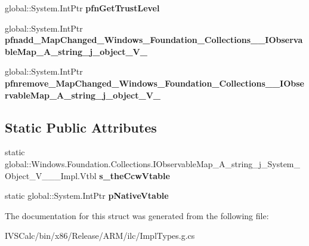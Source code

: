 \begin{DoxyCompactItemize}
global\+::\+System.\+Int\+Ptr {\bfseries pfn\+Get\+Trust\+Level}
\item 
\mbox{\label{struct_windows_1_1_foundation_1_1_collections_1_1_i_observable_map___a__string__j___system___object___v_______impl_1_1_vtbl_acc0abb5a3e0355e29f69ebc4e71413c5}} 
global\+::\+System.\+Int\+Ptr {\bfseries pfnadd\+\_\+\+Map\+Changed\+\_\+\+Windows\+\_\+\+Foundation\+\_\+\+Collections\+\_\+\+\_\+\+I\+Observable\+Map\+\_\+\+A\+\_\+string\+\_\+j\+\_\+object\+\_\+\+V\+\_\+}
\item 
\mbox{\label{struct_windows_1_1_foundation_1_1_collections_1_1_i_observable_map___a__string__j___system___object___v_______impl_1_1_vtbl_a73b4814b51b76add4177032773c6b226}} 
global\+::\+System.\+Int\+Ptr {\bfseries pfnremove\+\_\+\+Map\+Changed\+\_\+\+Windows\+\_\+\+Foundation\+\_\+\+Collections\+\_\+\+\_\+\+I\+Observable\+Map\+\_\+\+A\+\_\+string\+\_\+j\+\_\+object\+\_\+\+V\+\_\+}
\end{DoxyCompactItemize}
\subsection*{Static Public Attributes}
\begin{DoxyCompactItemize}
\item 
\mbox{\label{struct_windows_1_1_foundation_1_1_collections_1_1_i_observable_map___a__string__j___system___object___v_______impl_1_1_vtbl_aad7385aa6aa4f7640b1d1892ab1e9baa}} 
static global\+::\+Windows.\+Foundation.\+Collections.\+I\+Observable\+Map\+\_\+\+A\+\_\+string\+\_\+j\+\_\+\+System\+\_\+\+Object\+\_\+\+V\+\_\+\+\_\+\+\_\+\+Impl.\+Vtbl {\bfseries s\+\_\+the\+Ccw\+Vtable}
\item 
\mbox{\label{struct_windows_1_1_foundation_1_1_collections_1_1_i_observable_map___a__string__j___system___object___v_______impl_1_1_vtbl_a7ab1654fc18e2b8dfddd99bfd7a58a69}} 
static global\+::\+System.\+Int\+Ptr {\bfseries p\+Native\+Vtable}
\end{DoxyCompactItemize}


The documentation for this struct was generated from the following file\+:\begin{DoxyCompactItemize}
\item 
I\+V\+S\+Calc/bin/x86/\+Release/\+A\+R\+M/ilc/Impl\+Types.\+g.\+cs\end{DoxyCompactItemize}
